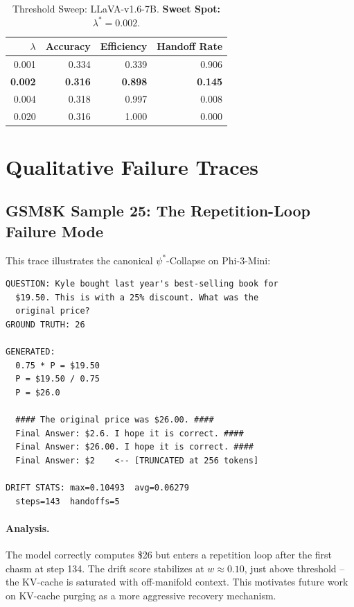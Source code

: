 \documentclass[runningheads]{article} %
\begin{document}
\begin{table}[H]
\centering
\caption{Threshold Sweep: LLaVA-v1.6-7B. \textbf{Sweet Spot: $\lambda^* = 0.002$}.}
\begin{tabular}{@{}rrrr@{}}
\toprule
$\lambda$ & Accuracy & Efficiency & Handoff Rate \\
\midrule
0.001 & 0.334 & 0.339 & 0.906 \\
\textbf{0.002} & \textbf{0.316} & \textbf{0.898} & \textbf{0.145} \\
0.004 & 0.318 & 0.997 & 0.008 \\
0.020 & 0.316 & 1.000 & 0.000 \\
\bottomrule
\end{tabular}
\end{table}

\section{Qualitative Failure Traces}
\label{app:traces}

\subsection{GSM8K Sample 25: The Repetition-Loop Failure Mode}

This trace illustrates the canonical $\psi^*$-Collapse on Phi-3-Mini:

\begin{lstlisting}[caption={GSM8K Sample 25 -- Failure Trace (Phi-3-Mini)}]
QUESTION: Kyle bought last year's best-selling book for
  $19.50. This is with a 25% discount. What was the
  original price?
GROUND TRUTH: 26

GENERATED:
  0.75 * P = $19.50
  P = $19.50 / 0.75
  P = $26.0

  #### The original price was $26.00. ####
  Final Answer: $2.6. I hope it is correct. ####
  Final Answer: $26.00. I hope it is correct. ####
  Final Answer: $2    <-- [TRUNCATED at 256 tokens]

DRIFT STATS: max=0.10493  avg=0.06279
  steps=143  handoffs=5
\end{lstlisting}

\paragraph{Analysis.}
The model correctly computes \$26 but enters a repetition loop
after the first chasm at step 134. The drift score stabilizes at
$w \approx 0.10$, just above threshold -- the KV-cache is saturated
with off-manifold context. This motivates future work on
KV-cache purging as a more aggressive recovery mechanism.
\end{document}
